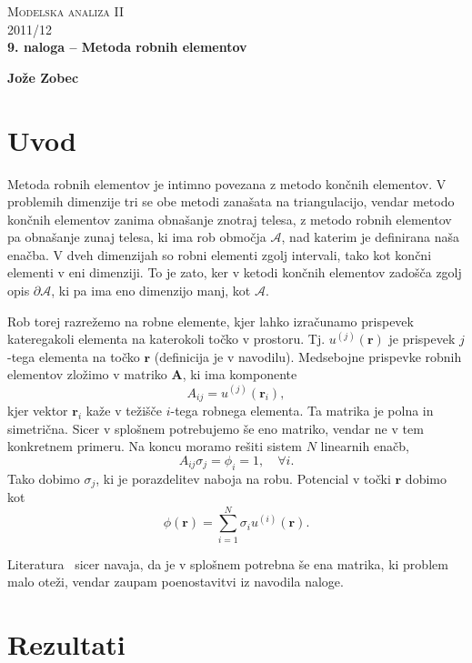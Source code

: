 \documentclass[a4 paper, 12pt]{article}
\renewcommand{\r}{
	\ensuremath{\mathbf{r}}
}
\begin{document}
\begin{center}
\textsc{Modelska analiza II}\\
\textsc{2011/12}\\[0.5cm]
\textbf{9. naloga -- Metoda robnih elementov}
\end{center}
\begin{flushright}
\textbf{Jože Zobec}\\
\end{flushright}

\section{Uvod}

Metoda robnih elementov je intimno povezana z metodo kon\v cnih elementov. V problemih dimenzije tri se
obe metodi zana\v sata na triangulacijo, vendar metodo kon\v cnih elementov zanima obna\v sanje znotraj telesa,
z metodo robnih elementov pa obna\v sanje zunaj telesa, ki ima rob obmo\v cja $\mathcal{A}$, nad katerim
je definirana na\v sa ena\v cba. V dveh dimenzijah so robni elementi zgolj intervali, tako kot kon\v cni
elementi v eni dimenziji. To je zato, ker v ketodi kon\v cnih elementov zado\v s\v ca zgolj opis
$\partial \mathcal{A}$, ki pa ima eno dimenzijo manj, kot $\mathcal{A}$.

Rob torej razre\v zemo na robne elemente, kjer lahko izra\v cunamo prispevek kateregakoli elementa na
katerokoli to\v cko v prostoru. Tj. $u^{(j)}(\r)$ je prispevek $j$-tega elementa na to\v cko $\r$ (definicija
je v navodilu). Medsebojne prispevke robnih elementov zlo\v zimo v matriko $\mathbf{A}$, ki ima komponente
\[
	A_{ij} = u^{(j)}(\r_i),
\]
kjer vektor $\r_i$ ka\v ze v te\v zi\v s\v ce $i$-tega robnega elementa.
Ta matrika je polna in simetri\v cna. Sicer v splo\v snem potrebujemo \v se eno matriko, vendar ne v
tem konkretnem primeru. Na koncu moramo re\v siti sistem $N$ linearnih ena\v cb,
\[
	A_{ij} \sigma_j = \phi_i = 1, \quad \forall i.
\] 
Tako dobimo $\sigma_j$, ki je porazdelitev naboja na robu. Potencial v to\v cki $\r$ dobimo kot
\[
	\phi(\r) = \sum_{i = 1}^N \sigma_i u^{(i)} (\r).
\] 

Literatura~\cite[str.~659]{sirca} sicer navaja, da je v splo\v snem potrebna \v se ena matrika, ki problem malo
ote\v zi, vendar zaupam poenostavitvi iz navodila naloge.
\section{Rezultati}
\end{document}
